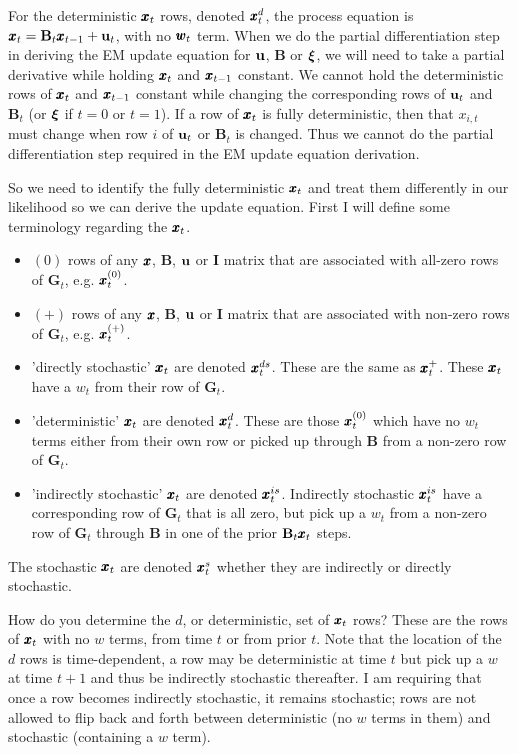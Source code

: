 \documentclass[]{article}
\def\xixi{\mbox{\boldmath $\xi$}}
\def\BB{\mbox{$\mathbf B$}}	\def\bb{\mbox{$\mathbf b$}}
\def\GG{\mbox{$\mathbf G$}}	\def\gg{\mbox{$\mathbf g$}}
\def\II{\mbox{$\mathbf I$}} \def\ii{\mbox{$\mathbf i$}}
\begin{document}
For the  deterministic $\mbox{$\pmb{x}$}_t$ rows, denoted $\mbox{$\pmb{x}$}_t^d$, the process equation is $\xx_t = \BB_t\xx_{t-1}+\uu_t$, with no $\mbox{$\pmb{w}$}_t$ term. When we do the partial differentiation step in deriving the EM update equation for $\mbox{$\mathbf u$}$, $\BB$ or $\xixi$, we will need to take a partial derivative  while holding $\mbox{$\pmb{x}$}_t$ and $\mbox{$\pmb{x}$}_{t-1}$ constant.   We cannot hold the deterministic rows of $\mbox{$\pmb{x}$}_t$ and $\mbox{$\pmb{x}$}_{t-1}$ constant while changing the corresponding rows of $\mbox{$\mathbf u$}_t$ and $\BB_t$ (or $\xixi$ if $t=0$ or $t=1$).  If a row of $\mbox{$\pmb{x}$}_t$ is fully deterministic, then that $x_{i,t}$ must change when row $i$ of $\mbox{$\mathbf u$}_t$ or $\BB_t$ is changed.  Thus we  cannot do the partial differentiation step required in the EM update equation derivation.  

So we need to identify the fully deterministic $\mbox{$\pmb{x}$}_t$ and treat them differently in our likelihood so we can derive the update equation.  First I will define some terminology regarding the $\mbox{$\pmb{x}$}_t$.
\begin{itemize}
  \item $(0)$ rows of any $\mbox{$\pmb{x}$}$, $\BB$, $\mbox{$\mathbf u$}$ or $\II$ matrix that are associated with all-zero rows of $\GG_t$, e.g. $\mbox{$\pmb{x}$}_t^{(0)}$.
  \item $(+)$ rows of any $\mbox{$\pmb{x}$}$, $\BB$, $\mbox{$\mathbf u$}$ or $\II$ matrix that are associated with non-zero rows of $\GG_t$, e.g. $\mbox{$\pmb{x}$}_t^{(+)}$.
  \item 'directly stochastic' $\mbox{$\pmb{x}$}_t$ are denoted $\mbox{$\pmb{x}$}_t^{ds}$. These are the same as $\mbox{$\pmb{x}$}_t^{+}$. These $\mbox{$\pmb{x}$}_t$ have a $w_t$ from their row of $\GG_t$.
  \item 'deterministic' $\mbox{$\pmb{x}$}_t$ are denoted $\mbox{$\pmb{x}$}_t^d$. These are those $\mbox{$\pmb{x}$}_t^{(0)}$ which have no $w_t$ terms either from their own row or picked up through $\BB$ from a non-zero row of $\GG_t$.
  \item 'indirectly stochastic' $\mbox{$\pmb{x}$}_t$ are denoted $\mbox{$\pmb{x}$}_t^{is}$. Indirectly stochastic $\mbox{$\pmb{x}$}_t^{is}$ have a corresponding row of $\GG_t$ that is all zero, but pick up a $w_t$ from a non-zero row of $\GG_t$ through $\BB$ in one of the prior $\BB_t\xx_t$ steps. 
\end{itemize}
The stochastic $\mbox{$\pmb{x}$}_t$ are denoted $\mbox{$\pmb{x}$}_t^s$ whether they are indirectly or directly stochastic.

How do you determine the $d$, or deterministic, set of $\mbox{$\pmb{x}$}_t$ rows?  These are the rows of $\mbox{$\pmb{x}$}_t$ with no $w$ terms, from time $t$ or from prior $t$.  Note that the location of the $d$ rows is time-dependent, a row may be deterministic at time $t$ but pick up a $w$ at time $t+1$ and thus be indirectly stochastic thereafter.  I am requiring that once a row becomes indirectly stochastic, it remains stochastic; rows are not allowed to flip back and forth between deterministic (no $w$ terms in them) and stochastic (containing a $w$ term).
\end{document}
